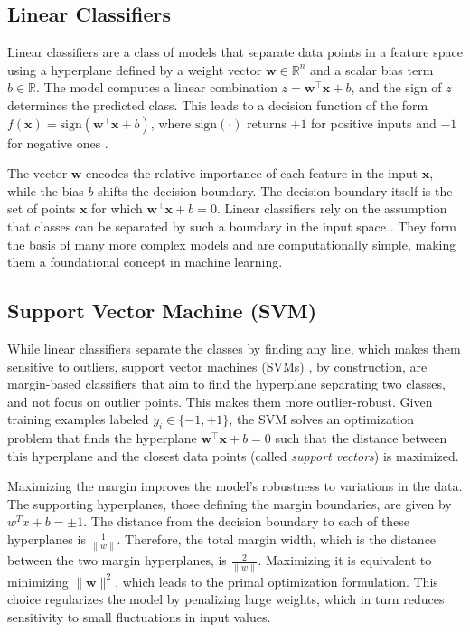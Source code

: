 \documentclass[12pt,a4paper,openany]{report}
\let\parencite\citep
\begin{document}
\subsection{Linear Classifiers}
Linear classifiers are a class of models that separate data points in a feature space using a hyperplane defined by a weight vector $\mathbf{w} \in \mathbb{R}^n$ and a scalar bias term $b \in \mathbb{R}$. The model computes a linear combination $z = \mathbf{w}^\top \mathbf{x} + b$, and the sign of $z$ determines the predicted class. This leads to a decision function of the form $f(\mathbf{x}) = \text{sign}(\mathbf{w}^\top \mathbf{x} + b)$, where $\text{sign}(\cdot)$ returns $+1$ for positive inputs and $-1$ for negative ones \parencite{rosenblatt1958}.

The vector $\mathbf{w}$ encodes the relative importance of each feature in the input $\mathbf{x}$, while the bias $b$ shifts the decision boundary. The decision boundary itself is the set of points $\mathbf{x}$ for which $\mathbf{w}^\top \mathbf{x} + b = 0$. Linear classifiers rely on the assumption that classes can be separated by such a boundary in the input space \parencite{rosenblatt1958}. They form the basis of many more complex models and are computationally simple, making them a foundational concept in machine learning.

\subsection{Support Vector Machine (SVM)}
While linear classifiers separate the classes by finding any line, which makes them sensitive to outliers, support vector machines (SVMs) \parencite{cortes1995svm}, by construction, are margin-based classifiers that aim to find the hyperplane separating two classes, and not focus on outlier points. This makes them more outlier-robust. Given training examples labeled $y_i \in \{-1, +1\}$, the SVM solves an optimization problem that finds the hyperplane $\mathbf{w}^\top \mathbf{x} + b = 0$ such that the distance between this hyperplane and the closest data points (called \textit{support vectors}) is maximized.

Maximizing the margin improves the model’s robustness to variations in the data. The supporting hyperplanes, those defining the margin boundaries, are given by \( w^T x + b = \pm 1 \). The distance from the decision boundary to each of these hyperplanes is \( \frac{1}{\|w\|} \). Therefore, the total margin width, which is the distance between the two margin hyperplanes, is \( \frac{2}{\|w\|} \). Maximizing it is equivalent to minimizing $\|\mathbf{w}\|^2$, which leads to the primal optimization formulation. This choice regularizes the model by penalizing large weights, which in turn reduces sensitivity to small fluctuations in input values.
\end{document}
